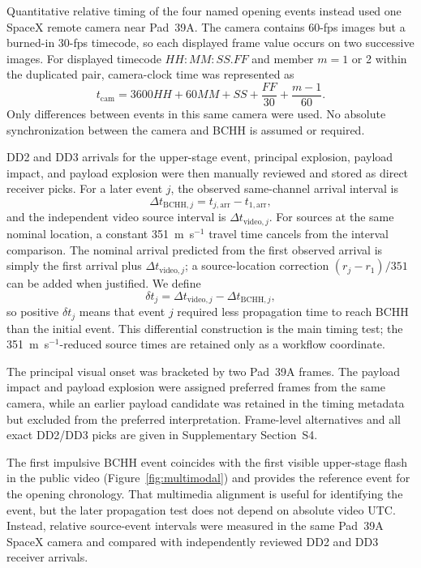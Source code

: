 \documentclass[]{seismica}
\begin{document}
Quantitative relative timing of the four named opening events instead used one
SpaceX remote camera near Pad~39A. The camera contains 60-fps images but a
burned-in 30-fps timecode, so each displayed frame value occurs on two
successive images. For displayed timecode $HH{:}MM{:}SS.FF$ and member
$m=1$ or 2 within the duplicated pair, camera-clock time was represented as
\begin{equation}
 t_{\mathrm{cam}}=3600HH+60MM+SS+\frac{FF}{30}+\frac{m-1}{60}.
 \label{eq:camera_clock}
\end{equation}
Only differences between events in this same camera were used. No absolute
synchronization between the camera and BCHH is assumed or required.

DD2 and DD3 arrivals for the upper-stage event, principal explosion, payload
impact, and payload explosion were then manually reviewed and stored as direct
receiver picks. For a later event $j$, the observed same-channel arrival
interval is
\begin{equation}
 \Delta t_{\mathrm{BCHH},j}=t_{j,\mathrm{arr}}-t_{1,\mathrm{arr}},
\end{equation}
and the independent video source interval is
$\Delta t_{\mathrm{video},j}$. For sources at the same nominal location, a
constant 351~m~s$^{-1}$ travel time cancels from the interval comparison. The
nominal arrival predicted from the first observed arrival is simply the first
arrival plus $\Delta t_{\mathrm{video},j}$; a source-location correction
$(r_j-r_1)/351$ can be added when justified. We define
\begin{equation}
 \delta t_j=\Delta t_{\mathrm{video},j}-\Delta t_{\mathrm{BCHH},j},
 \label{eq:differential_advance}
\end{equation}
so positive $\delta t_j$ means that event $j$ required less propagation time
to reach BCHH than the initial event. This differential construction is the
main timing test; the 351~m~s$^{-1}$-reduced source times are retained only as
a workflow coordinate.

The principal visual onset was bracketed by two Pad~39A frames. The payload
impact and payload explosion were assigned preferred frames from the same
camera, while an earlier payload candidate was retained in the timing metadata
but excluded from the preferred interpretation. Frame-level alternatives and
all exact DD2/DD3 picks are given in Supplementary Section~S4.

The first impulsive BCHH event coincides with the first visible upper-stage
flash in the public video (Figure~\ref{fig:multimodal}) and provides the
reference event for the opening chronology. That multimedia alignment is useful
for identifying the event, but the later propagation test does not depend on
absolute video UTC. Instead, relative source-event intervals were measured in
the same Pad~39A SpaceX camera and compared with independently reviewed DD2 and
DD3 receiver arrivals.
\end{document}
